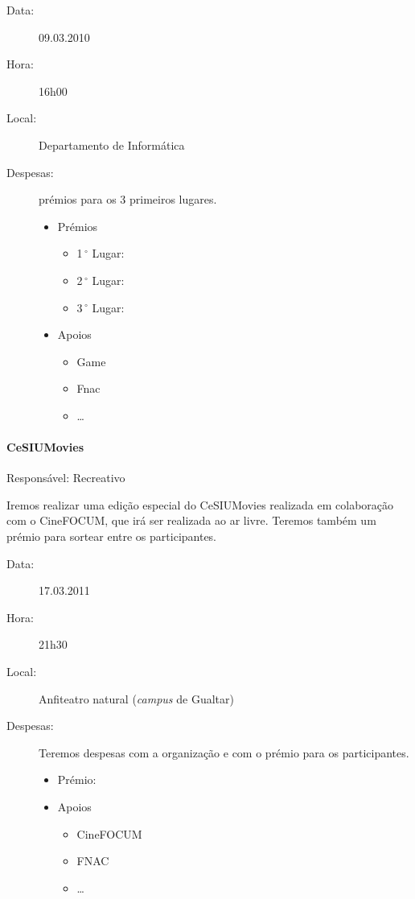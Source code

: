 \begin{description}
	\item[Data:] 09.03.2010
	\item[Hora:] 16h00
	\item[Local:] Departamento de Informática
	\item[Despesas:] prémios para os 3 primeiros lugares.
	\begin{itemize}
		\item Prémios
		\begin{itemize}
			\item 1$\,^{\circ}$ Lugar:
			\item 2$\,^{\circ}$ Lugar:
			\item 3$\,^{\circ}$ Lugar:
		\end{itemize}
		\item Apoios
		\begin{itemize}
			\item Game
			\item Fnac
			\item \dots  
		\end{itemize}
	\end{itemize}
\end{description}




\paragraph{CeSIUMovies}
Responsável: Recreativo

Iremos realizar uma edição especial do CeSIUMovies realizada em colaboração com o CineFOCUM, que irá ser realizada ao ar livre. Teremos também um prémio para sortear entre os participantes.

\begin{description}
	\item[Data:] 17.03.2011
	\item[Hora:] 21h30
	\item[Local:] Anfiteatro natural (\emph{campus} de Gualtar)
	\item[Despesas:] Teremos despesas com a organização e com o prémio para os participantes.
	\begin{itemize}
		\item Prémio:
		\item Apoios
		\begin{itemize}
			\item CineFOCUM
			\item FNAC
			\item \dots
		\end{itemize}
	\end{itemize}
\end{description}

